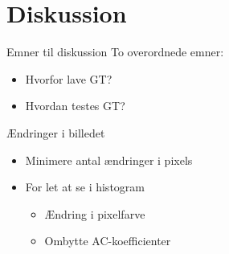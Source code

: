 \section{Diskussion} 
\begin{frame}{Emner til diskussion}
    To overordnede emner:
    \begin{itemize}
        \item Hvorfor lave GT?
        \item Hvordan testes GT?
    \end{itemize}
\end{frame}

\begin{frame}{Ændringer i billedet}

    \begin{itemize}
        \setlength\itemsep{1em}
        \item Minimere antal ændringer i pixels
        \item For let at se i histogram
        \begin{itemize}
            \vspace*{1em}
            \setlength\itemsep{1em}
            \item<con@1->[$\times$] Ændring i pixelfarve
            \item<pro@1->[\checkmark] Ombytte AC-koefficienter
        \end{itemize}
    \end{itemize}
\end{frame}

